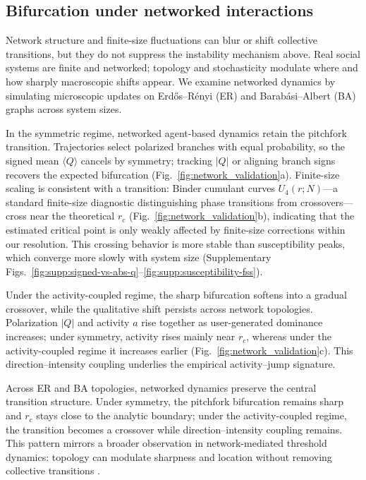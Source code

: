 \documentclass[preprint,12pt]{elsarticle}
\begin{document}
\subsection{Bifurcation under networked interactions}
\label{sec:network-validation}
Network structure and finite-size fluctuations can blur or shift collective transitions, but they do not suppress the instability mechanism above. Real social systems are finite and networked; topology and stochasticity modulate where and how sharply macroscopic shifts appear. We examine networked dynamics by simulating microscopic updates on Erd\H{o}s--R\'enyi (ER) and Barab\'asi--Albert (BA) graphs across system sizes.

In the symmetric regime, networked agent-based dynamics retain the pitchfork transition. Trajectories select polarized branches with equal probability, so the signed mean $\langle Q\rangle$ cancels by symmetry; tracking $|Q|$ or aligning branch signs recovers the expected bifurcation (Fig.~\ref{fig:network_validation}a). Finite-size scaling is consistent with a transition: Binder cumulant curves $U_4(r;N)$---a standard finite-size diagnostic distinguishing phase transitions from crossovers---cross near the theoretical $r_c$ (Fig.~\ref{fig:network_validation}b), indicating that the estimated critical point is only weakly affected by finite-size corrections within our resolution. This crossing behavior is more stable than susceptibility peaks, which converge more slowly with system size (Supplementary Figs.~\ref{fig:supp:signed-vs-abs-q}--\ref{fig:supp:susceptibility-fss}).

Under the activity-coupled regime, the sharp bifurcation softens into a gradual crossover, while the qualitative shift persists across network topologies. Polarization $|Q|$ and activity $a$ rise together as user-generated dominance increases; under symmetry, activity rises mainly near $r_c$, whereas under the activity-coupled regime it increases earlier (Fig.~\ref{fig:network_validation}c). This direction--intensity coupling underlies the empirical activity--jump signature.

Across ER and BA topologies, networked dynamics preserve the central transition structure. Under symmetry, the pitchfork bifurcation remains sharp and $r_c$ stays close to the analytic boundary; under the activity-coupled regime, the transition becomes a crossover while direction--intensity coupling remains. This pattern mirrors a broader observation in network-mediated threshold dynamics: topology can modulate sharpness and location without removing collective transitions \cite{Watts2002,Centola2010,Centola2018Tipping,Iacopini2019}.
\end{document}
